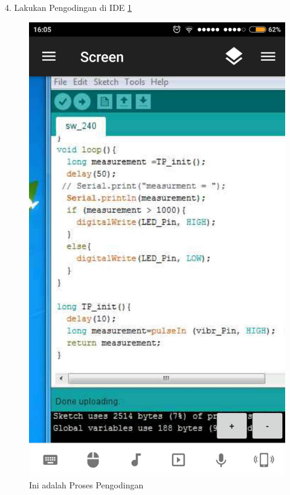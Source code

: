 \documentclass{article}
\begin{document}
 4. Lakukan Pengodingan di IDE 
  \ref{ar8}
  \begin{figure}[ht]
  \centerline{\includegraphics[width=1\textwidth]{../figures/ar8.jpg}}
  \caption{Ini adalah Proses Pengodingan}
  \label{ar8}
  \end{figure}

  
\end{document}
